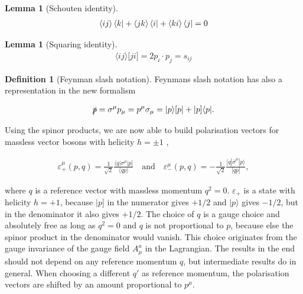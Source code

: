 \documentclass{article}
\theoremstyle{definition}
\newtheorem{definition}{Definition}[section]
\newtheorem{lemma}[theorem]{Lemma}
\numberwithin{equation}{section}
\begin{document}
\begin{lemma}[Schouten identity]

\begin{align}
    \langle ij \rangle \bra{k} + \langle jk \rangle \bra{i} + \langle ki \rangle \bra{j} = 0 \label{eq:schouten}
\end{align}

\end{lemma}

\begin{lemma}[Squaring identity]

\begin{align}
     \langle ij \rangle \lbrack ji \rbrack = 2 p_i \cdot p_j = s_{ij} \label{eq:ij}
\end{align}

\end{lemma}

\begin{definition}[Feynman slash notation]

Feynmans slash notation has also a representation in the new formalism

\begin{align}
     \slashed{p} = \sigma^{\mu} p_{\mu} = p^{\mu} \sigma_{\mu} = | p \rangle \lbrack p | + | p \rbrack \langle p |. \label{eq:slash}
\end{align}

\end{definition}

Using the spinor products, we are now able to build polarisation vectors for massless vector bosons with helicity $h=\pm1$ \cite{xu86},

\begin{align}
    \varepsilon_{+}^{\mu}(p,q) = \frac{1}{\sqrt{2}} \frac{\langle q | \sigma^{\mu} | p \rbrack }{ \langle qp \rangle } \quad \text{and} \quad \varepsilon_{-}^{\mu}(p,q) = - \frac{1}{\sqrt{2}} \frac{\lbrack q | \overline{\sigma}^{\mu} | p \rangle }{ \lbrack qp \rbrack }, \label{eq:polvecs}
\end{align}

where $q$ is a reference vector with massless momentum $q^2 = 0$. $\varepsilon_{+}$ is a state with helicity $h=+1$, because $| p \rbrack$ in the numerator gives $+1/2$ and $| p \rangle$ gives $-1/2$, but in the denominator it also gives $+1/2$. The choice of $q$ is a gauge choice and absolutely free as long as $q^2=0$ and $q$ is not proportional to $p$, because else the spinor product in the denominator would vanish. This choice originates from the gauge invariance of the gauge field $A^a_{\mu}$ in the Lagrangian. The results in the end should not depend on any reference momentum $q$, but intermediate results do in general. When choosing a different $q'$ as reference momentum, the polarisation vectors are shifted by an amount proportional to $p^{\mu}$.
\end{document}
